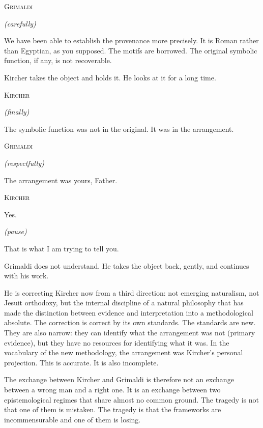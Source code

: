 \documentclass[12pt, a4paper, twoside]{memoir}
\theoremstyle{definition}
\theoremstyle{remark}
\newenvironment{action}{%
  \vspace{4pt}%
  \noindent\begin{minipage}{\linewidth}%
  \setlength{\parindent}{0pt}%
  \itshape\color{kircherink}%
}{%
  \end{minipage}\vspace{6pt}%
}
\newenvironment{dialogue}[1]{%
  \vspace{6pt}%
  \noindent\hspace{24mm}%
  \begin{minipage}{0.6\linewidth}%
  \begin{center}%
  {\small\textsc{#1}}%
  \end{center}%
  \vspace{2pt}%
}{%
  \end{minipage}\vspace{6pt}%
}
\newcommand{\paren}[1]{%
  \begin{center}%
  \small\itshape\color{plaguegrey}(#1)%
  \end{center}%
}
\begin{document}
\begin{dialogue}{Grimaldi}
\paren{carefully}
We have been able to establish the provenance more precisely. It is Roman rather than Egyptian, as you supposed. The motifs are borrowed. The original symbolic function, if any, is not recoverable.
\end{dialogue}

\begin{action}
Kircher takes the object and holds it. He looks at it for a long time.
\end{action}

\begin{dialogue}{Kircher}
\paren{finally}
The symbolic function was not in the original. It was in the arrangement.
\end{dialogue}

\begin{dialogue}{Grimaldi}
\paren{respectfully}
The arrangement was yours, Father.
\end{dialogue}

\begin{dialogue}{Kircher}
Yes.

\paren{pause}

That is what I am trying to tell you.
\end{dialogue}

\begin{action}
Grimaldi does not understand. He takes the object back, gently, and continues with his work.

He is correcting Kircher now from a third direction: not emerging naturalism, not Jesuit orthodoxy, but the internal discipline of a natural philosophy that has made the distinction between evidence and interpretation into a methodological absolute. The correction is correct by its own standards. The standards are new. They are also narrow: they can identify what the arrangement was not (primary evidence), but they have no resources for identifying what it was. In the vocabulary of the new methodology, the arrangement was Kircher's personal projection. This is accurate. It is also incomplete.

The exchange between Kircher and Grimaldi is therefore not an exchange between a wrong man and a right one. It is an exchange between two epistemological regimes that share almost no common ground. The tragedy is not that one of them is mistaken. The tragedy is that the frameworks are incommensurable and one of them is losing.
\end{action}
\end{document}
